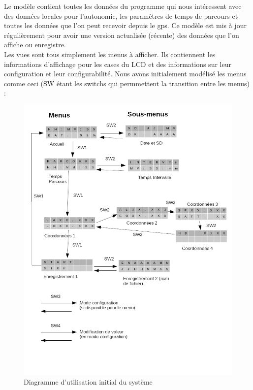 \documentclass{report}
\begin{document}
Le modèle contient toutes les données du programme qui nous intéressent
avec des données locales pour l'autonomie, les paramètres de temps de parcours
 et toutes les données que l'on peut recevoir depuis le gps. Ce modèle
 est mis à jour régulièrement pour avoir une version actualisée
 (récente) des données que l'on affiche ou enregistre. \\
 
Les vues sont tous simplement les menus à afficher. Ils contiennent
les informations d'affichage pour les cases du LCD et des informations
sur leur configuration et leur configurabilité. Nous avons initialement 
modélisé les menus comme ceci (SW étant les switchs qui permmettent
la transition entre les menus) :

\begin{figure}[H]
	\begin{center}
		\includegraphics[scale=0.5]{diagrammeCasUtilisation1.png}
	\end{center}
	\caption{Diagramme d'utilisation initial du système}
\end{figure}
\end{document}
